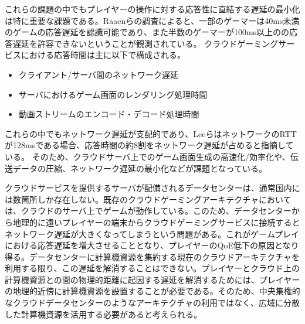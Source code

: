 これらの課題の中でもプレイヤーの操作に対する応答性に直結する遅延の最小化は特に重要な課題である。Raaen\cite{delay}らの調査によると、一部のゲーマーは40ms未満のゲームの応答遅延を認識可能であり、また半数のゲーマーが100ms以上のの応答遅延を許容できないということが観測されている。
クラウドゲーミングサービスにおける応答時間は主に以下で構成される。
\begin{itemize}
    \item クライアント/サーバ間のネットワーク遅延
    \item サーバにおけるゲーム画面のレンダリング処理時間
    \item 動画ストリームのエンコード・デコード処理時間
\end{itemize}
これらの中でもネットワーク遅延が支配的であり、Lee\cite{outatime}らはネットワークのRTTが128msである場合、応答時間の約8割をネットワーク遅延が占めると指摘している。
そのため、クラウドサーバ上でのゲーム画面生成の高速化/効率化や、伝送データの圧縮、ネットワーク遅延の最小化などが課題となっている。

クラウドサービスを提供するサーバが配備されるデータセンターは、通常国内には数箇所しか存在しない。既存のクラウドゲーミングアーキテクチャにおいては、クラウドのサーバ上でゲームが動作している。このため、データセンターから地理的に遠いプレイヤーの端末からクラウドゲーミングサービスに接続するとネットワーク遅延が大きくなってしまうという問題がある。これがゲームプレイにおける応答遅延を増大させることとなり、プレイヤーのQoE低下の原因となり得る。データセンターに計算機資源を集約する現在のクラウドアーキテクチャを利用する限り、この遅延を解消することはできない。プレイヤーとクラウド上の計算機資源との間の物理的距離に起因する遅延を解消するためには、プレイヤーの地理的近傍に計算機資源を設置することが必要である。そのため、中央集権的なクラウドデータセンターのようなアーキテクチャの利用ではなく、広域に分散した計算機資源を活用する必要があると考えられる。

